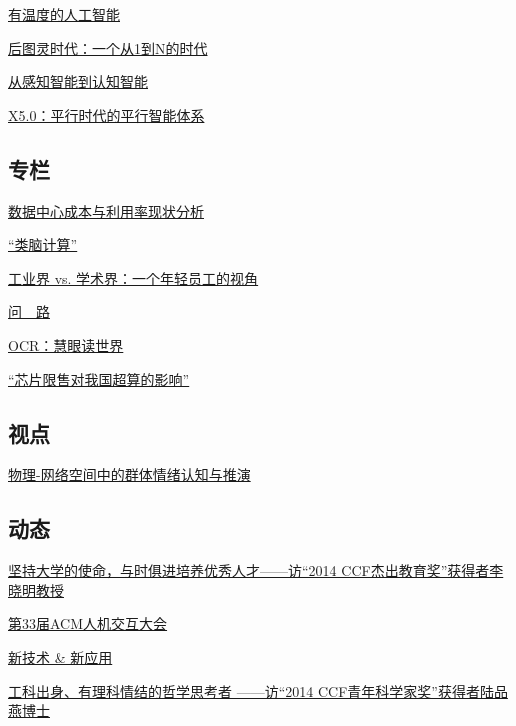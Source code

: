 \documentclass[a4paper]{article}
\begin{document}
\href{http://history.ccf.org.cn/resources/1190201776262/2015/05/12/3.pdf}{有温度的人工智能}

\href{http://history.ccf.org.cn/resources/1190201776262/2015/05/12/4.pdf}{后图灵时代：一个从1到N的时代}

\href{http://history.ccf.org.cn/resources/1190201776262/2015/05/12/5.pdf}{从感知智能到认知智能}

\href{http://history.ccf.org.cn/resources/1190201776262/2015/05/12/2.pdf}{X5.0：平行时代的平行智能体系}

\subsection{专栏}
\href{http://history.ccf.org.cn/resources/1190201776262/2015/05/12/8.pdf}{数据中心成本与利用率现状分析}

\href{http://history.ccf.org.cn/resources/1190201776262/2015/05/13/13.pdf}{“类脑计算”}

\href{http://history.ccf.org.cn/resources/1190201776262/2015/05/12/10.pdf}{工业界 vs. 学术界：一个年轻员工的视角}

\href{http://history.ccf.org.cn/resources/1190201776262/2015/05/13/11.pdf}{问　路}

\href{http://history.ccf.org.cn/resources/1190201776262/2015/05/12/9.pdf}{OCR：慧眼读世界}

\href{http://history.ccf.org.cn/resources/1190201776262/2015/05/13/12.pdf}{“芯片限售对我国超算的影响”}

\subsection{视点}
\href{http://history.ccf.org.cn/resources/1190201776262/2015/05/13/14.pdf}{物理-网络空间中的群体情绪认知与推演}

\subsection{动态}
\href{http://history.ccf.org.cn/resources/1190201776262/2015/05/13/16.pdf}{坚持大学的使命，与时俱进培养优秀人才——访“2014 CCF杰出教育奖”获得者李晓明教授}

\href{http://history.ccf.org.cn/resources/1190201776262/2015/05/13/17.pdf}{第33届ACM人机交互大会}

\href{http://history.ccf.org.cn/resources/1190201776262/2015/05/13/18.pdf}{新技术 \& 新应用}

\href{http://history.ccf.org.cn/resources/1190201776262/2015/05/13/15.pdf}{工科出身、有理科情结的哲学思考者 ——访“2014 CCF青年科学家奖”获得者陆品燕博士}
\end{document}
